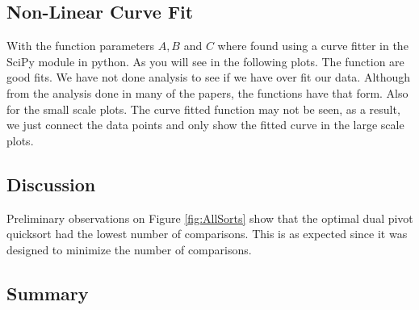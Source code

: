 	\subsection{Non-Linear Curve Fit}
		\label{subsec:CurveFit}

		With the function parameters $A,B$ and $C$ where found using a curve fitter in the SciPy module in python.
		As you will see in the following plots. The function are good fits.
		We have not done analysis to see if we have over fit our data.
		Although from the analysis done in many of the papers, the functions
		have that form.
		Also for the small scale plots. The curve fitted function may not be
		seen, as a result, we just connect the data points and only show the
		fitted curve in the large scale plots.

	\subsection{Discussion}

		Preliminary observations on Figure \ref{fig:AllSorts} show that the optimal dual pivot quicksort had the lowest number of comparisons.
		This is as expected since it was designed to minimize the number of comparisons.


	\subsection{Summary}











